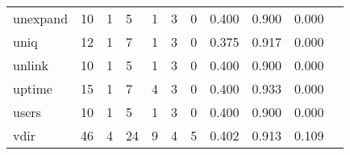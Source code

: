 \begin{longtable}{lp{1.2cm}p{1.2cm}p{1.2cm}p{1.2cm}p{1.2cm}p{1.2cm}p{1.2cm}p{1.2cm}p{1.2cm}p{1.2cm}}
unexpand  &                                    10 &                                                  1 &                                                  5 &                                                  1 &                                                  3 &                                                  0 &                                              0.400 &                                              0.900 &                                              0.000 \\
uniq      &                                    12 &                                                  1 &                                                  7 &                                                  1 &                                                  3 &                                                  0 &                                              0.375 &                                              0.917 &                                              0.000 \\
unlink    &                                    10 &                                                  1 &                                                  5 &                                                  1 &                                                  3 &                                                  0 &                                              0.400 &                                              0.900 &                                              0.000 \\
uptime    &                                    15 &                                                  1 &                                                  7 &                                                  4 &                                                  3 &                                                  0 &                                              0.400 &                                              0.933 &                                              0.000 \\
users     &                                    10 &                                                  1 &                                                  5 &                                                  1 &                                                  3 &                                                  0 &                                              0.400 &                                              0.900 &                                              0.000 \\
vdir      &                                    46 &                                                  4 &                                                 24 &                                                  9 &                                                  4 &                                                  5 &                                              0.402 &                                              0.913 &                                              0.109 \\

\end{longtable}
